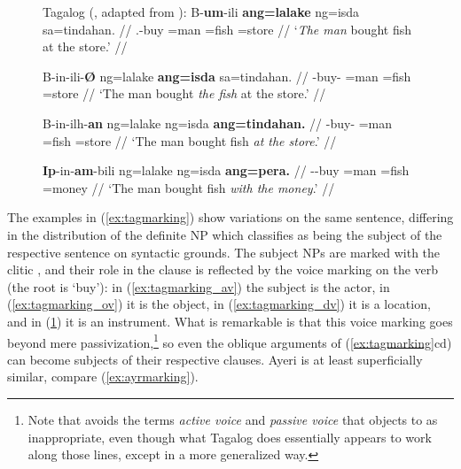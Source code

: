 \begin{figure}
\pex\label{ex:tagmarking}%
Tagalog (\cite[14]{kroeger1991}, adapted from \cite[135]{foleyvanvalin1984}):
\a\label{ex:tagmarking_av}\begingl
	\gla B-\textbf{um}-ili \textbf{ang=lalake} ng=isda sa=tindahan. //
	\glb \Pfv{}.\Av{}-buy \Nom{}=man \Gen{}=fish \Dat{}=store //
	\glft `\emph{The man} bought fish at the store.' //
\endgl

\a\label{ex:tagmarking_ov}\begingl
	\gla B-in-ili-\textbf{Ø} ng=lalake \textbf{ang=isda} sa=tindahan. //
	\glb \Pfv{}-buy-\Ov{} \Gen{}=man \Nom{}=fish \Dat{}=store //
	\glft `The man bought \emph{the fish} at the store.' //
\endgl

\a\label{ex:tagmarking_dv}\begingl
	\gla B-in-ilh-\textbf{an} ng=lalake ng=isda \textbf{ang=tindahan.} //
	\glb \Pfv{}-buy-\Dv{} \Gen{}=man \Gen{}=fish \Nom{}=store //
	\glft `The man bought fish \emph{at the store}.' //
\endgl

\a\label{ex:tagmarking_iv}\begingl
	\gla \textbf{Ip}-in-\textbf{am}-bili ng=lalake ng=isda 
		\textbf{ang=pera.} //
	\glb \Iv{}-\Pfv{}-buy \Gen{}=man \Gen{}=fish \Nom{}=money //
	\glft `The man bought fish \emph{with the money}.' //
\endgl


\xe
\end{figure}

The examples in (\ref{ex:tagmarking}) show variations on the same sentence,
differing in the distribution of the definite NP which \citet{kroeger1991}
classifies as being the subject of the respective sentence on syntactic
grounds. The subject NPs are marked with the clitic , and their role in
the clause is reflected by the voice marking on the verb (the root is 
`buy'): in (\ref{ex:tagmarking_av}) the subject is the actor, in
(\ref{ex:tagmarking_ov}) it is the object, in (\ref{ex:tagmarking_dv}) it is a
location, and in (\ref{ex:tagmarking_iv}) it is an instrument. What is
remarkable is that this voice marking goes beyond mere
passivization,\footnote{Note that \citet{kroeger1991} avoids the terms
\emph{active voice} and \emph{passive voice} that \citet{schachter2015} objects
to as inappropriate, even though what Tagalog does essentially appears to work
along those lines, except in a more generalized way.} so even the oblique
arguments of (\ref{ex:tagmarking}cd) can become subjects of their respective
clauses. Ayeri is at least superficially similar, compare
(\ref{ex:ayrmarking}).

